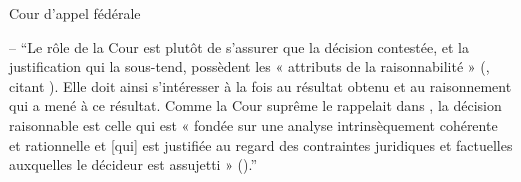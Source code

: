 \p 	Cour d'appel fédérale

-- \enquote{Le rôle de la Cour est plutôt de s’assurer que la décision contestée, et la justification qui la sous-tend, possèdent les « attributs de la raisonnabilité » (, citant ). Elle doit ainsi s’intéresser à la fois au résultat obtenu et au raisonnement qui a mené à ce résultat. Comme la Cour suprême le rappelait dans , la décision raisonnable est celle qui est « fondée sur une analyse intrinsèquement cohérente et rationnelle et [qui] est justifiée au regard des contraintes juridiques et factuelles auxquelles le décideur est assujetti » ().} 



\bigskip
{}


\printbibliographymcgill

